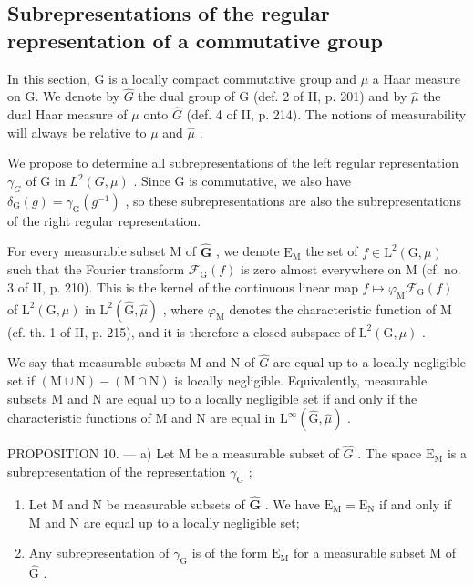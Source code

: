 \subsection{Subrepresentations of the regular representation of a commutative group}

In this section, G is a locally compact commutative group and \(\mu\) a Haar measure on G. We denote by \(\hat{G}\) the dual group of G (def. 2 of II, p. 201) and by \(\hat{\mu}\) the dual Haar measure of \(\mu\) onto \(\hat{G}\) (def. 4 of II, p. 214). The notions of measurability will always be relative to \(\mu\) and \(\hat{\mu}\) .

We propose to determine all subrepresentations of the left regular representation \(\gamma_{G}\) of G in \(L^{2}(G,\mu)\) . Since G is commutative, we also have \(\delta_{\mathrm{G}}(g)=\gamma_{\mathrm{G}}(g^{-1})\) , so these subrepresentations are also the subrepresentations of the right regular representation.

For every measurable subset M of \(\widehat{\mathbf{G}}\) , we denote \(\mathrm{E_M}\) the set of \(f \in \mathrm{L}^2 (\mathrm{G},\mu)\) such that the Fourier transform \(\mathcal{F}_{\mathrm{G}}(f)\) is zero almost everywhere on M (cf. no. 3 of II, p. 210). This is the kernel of the continuous linear map \(f \mapsto \varphi_{\mathrm{M}}\mathcal{F}_{\mathrm{G}}(f)\) of \(\mathrm{L}^2 (\mathrm{G},\mu)\) in \(\mathrm{L}^2 (\widehat{\mathrm{G}},\widehat{\mu})\) , where \(\varphi_{\mathrm{M}}\) denotes the characteristic function of M (cf. th. 1 of II, p. 215), and it is therefore a closed subspace of \(\mathrm{L}^2 (\mathrm{G},\mu)\) .

We say that measurable subsets M and N of \(\widehat{G}\) are equal up to a locally negligible set if \((\mathrm{M} \cup \mathrm{N}) - (\mathrm{M} \cap \mathrm{N})\) is locally negligible. Equivalently, measurable subsets M and N are equal up to a locally negligible set if and only if the characteristic functions of M and N are equal in \(\mathrm{L}^{\infty}(\widehat{\mathrm{G}}, \widehat{\mu})\) .

PROPOSITION 10. --- a) Let M be a measurable subset of \(\widehat{G}\) . The space \(\mathrm{E}_{\mathrm{M}}\) is a subrepresentation of the representation \(\gamma_{\mathrm{G}}\) ;

\begin{enumerate}
\def\labelenumi{\alph{enumi})}
\setcounter{enumi}{1}
\item
  Let M and N be measurable subsets of \(\widehat{\mathbf{G}}\) . We have \(\mathrm{E_M} = \mathrm{E_N}\) if and only if M and N are equal up to a locally negligible set;
\item
  Any subrepresentation of \(\gamma_{\mathrm{G}}\) is of the form \(\mathrm{E}_{\mathrm{M}}\) for a measurable subset M of \(\widehat{\mathrm{G}}\) .
\end{enumerate}

